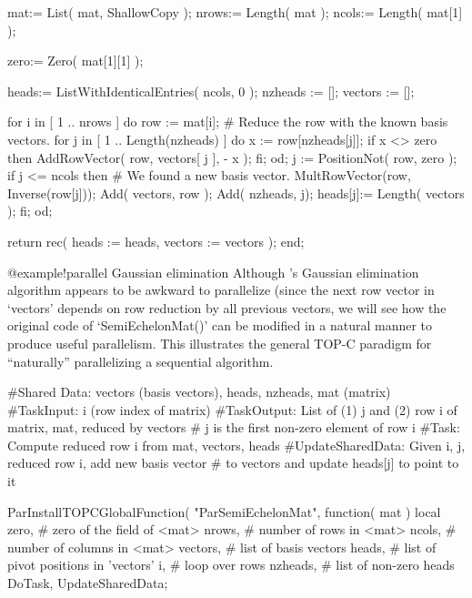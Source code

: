     mat:= List( mat, ShallowCopy );
    nrows:= Length( mat );
    ncols:= Length( mat[1] );

    zero:= Zero( mat[1][1] );

    heads:= ListWithIdenticalEntries( ncols, 0 );
    nzheads := [];
    vectors := [];

    for i in [ 1 .. nrows ] do
        row := mat[i];
        # Reduce the row with the known basis vectors.
        for j in [ 1 .. Length(nzheads) ] do
            x := row[nzheads[j]];
            if x <> zero then
                AddRowVector( row, vectors[ j ], - x );
            fi;
        od;
        j := PositionNot( row, zero );
        if j <= ncols then
            # We found a new basis vector.
            MultRowVector(row, Inverse(row[j]));
            Add( vectors, row );
            Add( nzheads, j);
            heads[j]:= Length( vectors );
        fi;
    od;

    return rec( heads   := heads,
                vectors := vectors );
    end;
\endexample

%
{@example!parallel Gaussian elimination}
Although {\GAP}'s Gaussian elimination algorithm appears to be
awkward to parallelize (since the next row vector in `vectors' depends
on row reduction by all previous vectors, we will see how the original
code of `SemiEchelonMat()' can be modified in a natural manner to
produce useful parallelism.  This illustrates the general TOP-C
paradigm for ``naturally'' parallelizing a sequential algorithm.

\beginexample
#Shared Data: vectors (basis vectors), heads, nzheads, mat (matrix)
#TaskInput:   i (row index of matrix)
#TaskOutput:  List of (1) j and (2) row i of matrix, mat, reduced by vectors
#               j is the first non-zero element of row i
#Task:        Compute reduced row i from mat, vectors, heads
#UpdateSharedData:  Given i, j, reduced row i, add new basis vector
#               to vectors and update heads[j] to point to it

ParInstallTOPCGlobalFunction( "ParSemiEchelonMat", function( mat )
    local zero,      # zero of the field of <mat>
          nrows,     # number of rows in <mat>
          ncols,     # number of columns in <mat>
          vectors,   # list of basis vectors
          heads,     # list of pivot positions in 'vectors'
          i,         # loop over rows
          nzheads,   # list of non-zero heads
          DoTask, UpdateSharedData;

